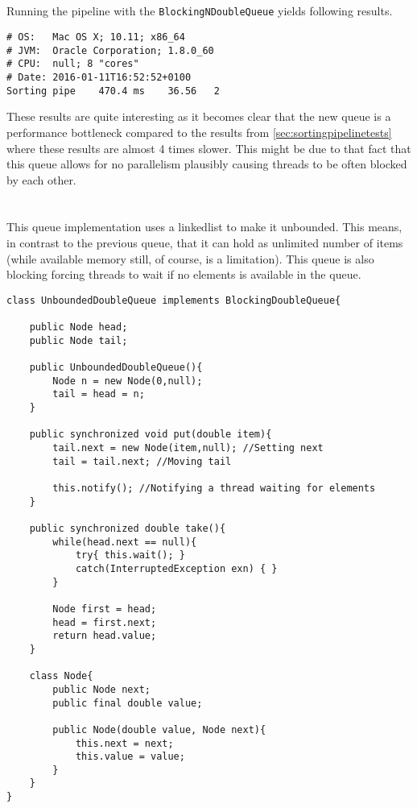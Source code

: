 \documentclass{ituhandin}
\begin{document}
\section{}
Running the pipeline with the \texttt{BlockingNDoubleQueue} yields following results.
\begin{lstlisting}[language={},frame={}]
# OS:   Mac OS X; 10.11; x86_64
# JVM:  Oracle Corporation; 1.8.0_60
# CPU:  null; 8 "cores"
# Date: 2016-01-11T16:52:52+0100
Sorting pipe    470.4 ms    36.56   2
\end{lstlisting}
These results are quite interesting as it becomes clear that the new queue is a performance bottleneck compared to the results from \ref{sec:sortingpipelinetests} where these results are almost 4 times slower. This might be due to that fact that this queue allows for no parallelism plausibly causing threads to be often blocked by each other.

\chapter{} %
\section{}
This queue implementation uses a linkedlist to make it unbounded. This means, in contrast to the previous queue, that it can hold as unlimited number of items (while available memory still, of course, is a limitation). This queue is also blocking forcing threads to wait if no elements is available in the queue.
\begin{lstlisting}[caption= Implementation of the \texttt{UnboundedDoubleQueue} blocking queue]
class UnboundedDoubleQueue implements BlockingDoubleQueue{

    public Node head;
    public Node tail;

    public UnboundedDoubleQueue(){
        Node n = new Node(0,null);
        tail = head = n;
    }

    public synchronized void put(double item){
        tail.next = new Node(item,null); //Setting next
        tail = tail.next; //Moving tail

        this.notify(); //Notifying a thread waiting for elements
    }

    public synchronized double take(){
        while(head.next == null){
            try{ this.wait(); }
            catch(InterruptedException exn) { }
        }

        Node first = head;
        head = first.next;
        return head.value;
    }

    class Node{
        public Node next;
        public final double value;

        public Node(double value, Node next){
            this.next = next;
            this.value = value;
        }
    }
}
\end{lstlisting}
\end{document}
